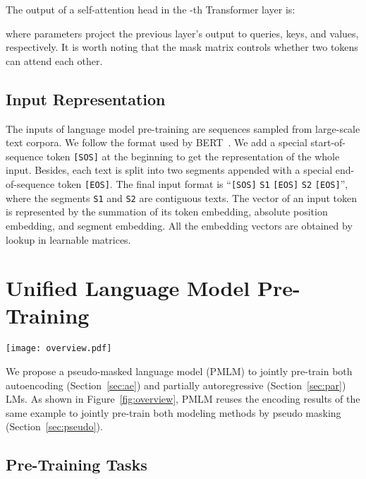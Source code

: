 \documentclass{article}
\newcommand\pmlmfull{pseudo-masked language model}
\newcommand\pmlm{\textsc{PMLM}}
\newcommand{\sptk}[1]{\texttt{[#1]}}
\begin{document}
The output  of a self-attention head in the -th Transformer layer is:

where parameters  project the previous layer's output  to queries, keys, and values, respectively.
It is worth noting that the mask matrix  controls whether two tokens can attend each other.


\subsection{Input Representation}
\label{sec:input}

The inputs of language model pre-training are sequences sampled from large-scale text corpora.
We follow the format used by BERT~\cite{bert}.
We add a special start-of-sequence token \sptk{SOS} at the beginning to get the representation of the whole input.
Besides, each text is split into two segments appended with a special end-of-sequence token \sptk{EOS}.
The final input format is ``\sptk{SOS} \texttt{S1} \sptk{EOS} \texttt{S2} \sptk{EOS}'', where the segments \texttt{S1} and \texttt{S2} are contiguous texts.
The vector of an input token is represented by the summation of its token embedding, absolute position embedding, and segment embedding.
All the embedding vectors are obtained by lookup in learnable matrices.


\section{Unified Language Model Pre-Training}


\begin{figure*}[t]
\centering
\texttt{[image: overview.pdf]}
\caption{Overview of \pmlm{} pre-training. The model parameters are shared across the LM objectives. The bidirectional LM is trained by autoencoding MLM, and the sequence-to-sequence (Seq-to-Seq) LM is trained by partially autoregressive MLM. We use different self-attention masks to control the access to context for each word token.}
\label{fig:overview}
\end{figure*}


We propose a \pmlmfull{} (\pmlm{}) to jointly pre-train both autoencoding (Section~\ref{sec:ae}) and partially autoregressive (Section~\ref{sec:par}) LMs.
As shown in Figure~\ref{fig:overview}, \pmlm{} reuses the encoding results of the same example to jointly pre-train both modeling methods by pseudo masking (Section~\ref{sec:pseudo}).


\subsection{Pre-Training Tasks}
\label{sec:pretrain:tasks}
\end{document}

